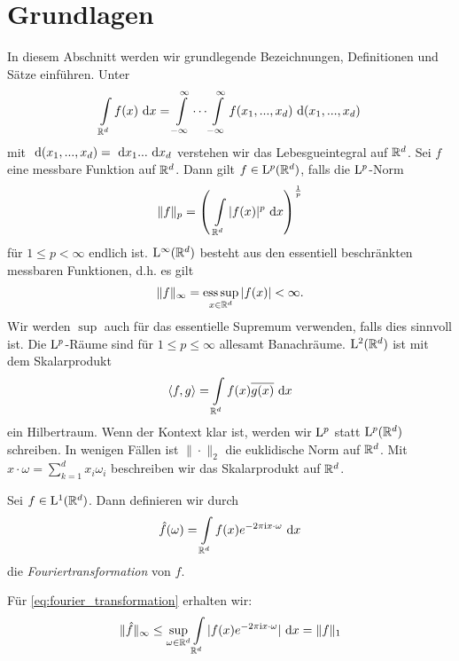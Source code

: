 \section{Grundlagen}
\vspace{-0.5cm}
In diesem Abschnitt werden wir grundlegende Bezeichnungen, Definitionen und Sätze einführen.
Unter 
\begin{align}
\int \limits_{\mathbb{R}^d} f(x) \text{ d} x
=
\int \limits_{-\infty}^\infty \cdots \int \limits_{-\infty}^\infty f(x_1,...,x_d) \text{ d} (x_1,...,x_d) 
\end{align}
mit $ \text{ d} (x_1,...,x_d) = \text{ d} x_1...\text{ d} x_d $ verstehen wir das Lebesgueintegral auf $ \mathbb{R}^d $.
Sei $ f  $ eine messbare Funktion auf $ \mathbb{R}^d $.
Dann gilt $ f \in \mathrm{L}^p(\mathbb{R}^d) $, falls die $ \mathrm{L}^p $-Norm
\begin{align}
\| f \|_p = \left(  \ \int \limits_{\mathbb{R}^d} | f(x) |^p \text{ d} x \right)^{\frac{1}{p}}
\end{align}
für $ 1 \leq p < \infty $ endlich ist.
$ \mathrm{L}^\infty(\mathbb{R}^d) $ besteht aus den essentiell beschränkten messbaren Funktionen, d.h. es gilt
\begin{align*}
\|f \|_\infty 
= 
\operatorname*{ess\,sup} \limits_{x \in \mathbb{R}^d} | f(x) | < \infty.
\end{align*}
Wir werden $ \sup $ auch für das essentielle Supremum verwenden, falls dies sinnvoll ist.
Die $ \mathrm{L}^p $-Räume sind für $ 1 \leq p \leq \infty $ allesamt Banachräume. 
$ \mathrm{L}^2(\mathbb{R}^d) $ ist mit dem Skalarprodukt
\begin{align}
\langle f, g \rangle
=
\int \limits_{\mathbb{R}^d} f(x) \overline{g(x)} \text{ d} x
\end{align}
ein Hilbertraum. Wenn der Kontext klar ist, werden wir $ \mathrm{L}^p $ statt $ \mathrm{L}^p(\mathbb{R}^d) $ schreiben.
In wenigen Fällen ist $ \| \cdot \|_2 $ die euklidische Norm auf $ \mathbb{R}^d $.
Mit $ x \cdot \omega = \sum_{k=1}^d x_i \omega_i$ beschreiben wir das Skalarprodukt auf $ \mathbb{R}^d $.
\begin{df}
	Sei $ f \in \mathrm{L}^1(\mathbb{R}^d) $. Dann definieren wir durch
	\begin{align}\label{eq:fourier_transformation}
	\hat{f}(\omega) =
	\int \limits_{\mathbb{R}^d} f(x) e^{-2 \pi \textrm{i} x \cdot \omega} \text{ d} x
	\end{align}
	die \textit{Fouriertransformation} von $ f $.	
\end{df}
Für \eqref{eq:fourier_transformation} erhalten wir:
\begin{align}\label{eq:estimate_fouriertransformation}
\| \hat{f} \|_{\infty}
\leq
\sup \limits_{\omega \in \mathbb{R}^d} \int \limits_{\mathbb{R}^d} |f(x) e^{-2 \pi \textrm{i} x \cdot \omega}| \text{ d} x = \| f \|_1
\end{align}
